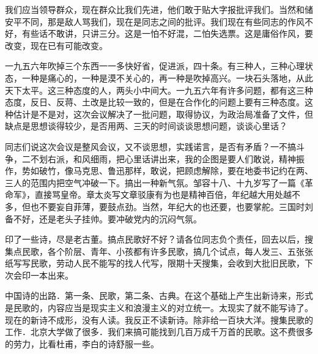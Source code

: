 我们应当领导群众，现在群众比我们先进，他们敢于贴大字报批评我们。当然和储安平不同，那是敌人骂我们，现在是同志之间的批评。我们现在有些同志的作风不好，有些话不敢讲，只讲三分。这是一怕不好混，二怕失选票。这是庸俗作风，要改变，现在已有可能改变。

一九五六年吹掉三个东西一一多快好省，促进派，四十条。有三种人，三种心理状态，一种是痛心的，一种是漠不关心的，再一种是吹掉高兴。一块石头落地，从此天下太平。这三种态度的人，两头小中间大。一九五六年有许多问题，都有这三种态度，反日、反蒋、土改是比较一致的，但是在合作化的问题上要有三种态度。这种估计是不是对，这次会议解决了一批问题，取得协议，为政治局准备了文件，但缺点是思想谈得较少，是否用两、三天的时间谈谈思想问题，谈谈心里话？

同志们说这次会议是整风会议，又不谈思想，实践诺言，是否有矛盾？一不搞斗争，二不划右派，和风细雨，把心里话讲出来，我的企图是要人们敢说，精神振作，势如破竹，像马克思、鲁迅那样，敢说，把顾虑解除，要在地委书记约在两、三人的范围内把空气冲破一下。搞出一种新气氛。邹容十八、十九岁写了一篇《革命军》，直接骂皇帝。章太炎写文章驳康有为也是精神百倍，年纪越大用处越不多，但也不要妄自菲薄，要鼓点劲。当然，年纪大的也还要，也要掌舵。三国时刘备不好，还是老头子挂帅。要冲破党内的沉闷气氛。

印了一些诗，尽是老古董。搞点民歌好不好？请各位同志负个责任，回去以后，搜集点民歌，各个阶层、青年、小孩都有许多民歌，搞几个试点，每人发三、五张张纸写写民歌，劳动人民不能写的找人代写，限期十天搜集，会收到大批旧民歌，下次会印一本出来。

中国诗的出路．第一条、民歌，第二条、古典。在这个基础上产生出新诗来，形式是民歌的，内容应当是现实主义和浪漫主义的对立统一。太现实了就不能写诗了。现在的新诗不成形，没有人读。我反正不读新诗。除非给一百块大洋。搜集民歌的工作．北京大学做了很多．我们来搞可能找到几百万成千万首的民歌。这不费很多的劳力，比看杜甫，李白的诗舒服一些。

